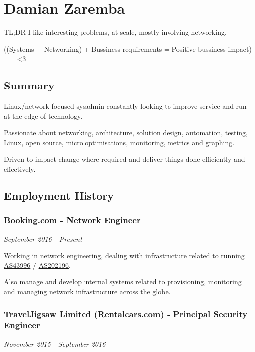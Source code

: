 \section{Damian Zaremba}\label{damian-zaremba}

TL;DR I like interesting problems, at scale, mostly involving
networking.

((Systems + Networking) + Bussiness requirements = Positive bussiness
impact) == \textless{}3

\subsection{Summary}\label{summary}

Linux/network focused sysadmin constantly looking to improve service and
run at the edge of technology.

Passionate about networking, architecture, solution design, automation,
testing, Linux, open source, micro optimisations, monitoring, metrics
and graphing.

Driven to impact change where required and deliver things done
efficiently and effectively.

\subsection{Employment History}\label{employment-history}

\subsubsection{Booking.com - Network
Engineer}\label{booking.com---network-engineer}

\emph{September 2016 - Present}

Working in network engineering, dealing with infrastructure related to
running \href{https://stat.ripe.net/AS43996}{AS43996} /
\href{https://stat.ripe.net/AS202196}{AS202196}.

Also manage and develop internal systems related to provisioning,
monitoring and managing network infrastructure across the globe.

\subsubsection{TravelJigsaw Limited (Rentalcars.com) - Principal
Security
Engineer}\label{traveljigsaw-limited-rentalcars.com---principal-security-engineer}

\emph{November 2015 - September 2016}

